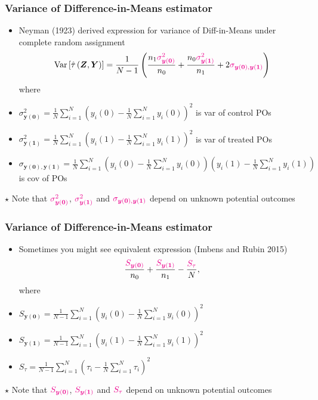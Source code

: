 \documentclass[table, xcolor = {dvipsnames}, 9pt]{beamer}
\theoremstyle{plain}
\newcommand{\mh}[1]{{\color{magenta}{#1}}}
\DeclareMathOperator{\Var}{\rm{Var}}
\begin{document}
\begin{frame}
\frametitle{Variance of Difference-in-Means estimator}
\begin{itemize}
\item Neyman (1923) derived expression for variance of Diff-in-Means under complete random assignment
\begin{equation*}
\Var\left[\hat{\tau}\left(\bm{Z}, \bm{Y}\right)\right] = \frac{1}{N - 1}\left(\frac{n_1 \mh{\sigma^2_{\bm{y}(\bm{0})}}}{n_0} + \frac{n_0 \mh{\sigma^2_{\bm{y}(\bm{1})}}}{n_1} + 2\mh{\sigma_{\bm{y}(\bm{0}), \bm{y}(\bm{1})}}\right)
\end{equation*}  
where 
\item[] $\sigma^2_{\bm{y}(\bm{0})} = \frac{1}{N} \sum \limits_{i = 1}^N \left(y_i(0) - \frac{1}{N} \sum \limits_{i = 1}^N y_i(0)\right)^2$ is var of control POs
\item[] $\sigma^2_{\bm{y}(\bm{1})} = \frac{1}{N} \sum \limits_{i = 1}^N \left(y_i(1) - \frac{1}{N} \sum \limits_{i = 1}^N y_i(1)\right)^2$ is var of treated POs
\item[] $\sigma_{\bm{y}(\bm{0}), \bm{y}(\bm{1})} = \frac{1}{N} \sum \limits_{i = 1}^N \left(y_i(0) - \frac{1}{N} \sum \limits_{i = 1}^N y_i(0)\right)\left(y_i(1) - \frac{1}{N} \sum \limits_{i = 1}^N y_i(1)\right)$ is cov of POs
\end{itemize} \pause
\vspace{1em}
$\star$ Note that $\mh{\sigma^2_{\bm{y}(\bm{0})}}$, $\mh{\sigma^2_{\bm{y}(\bm{1})}}$ and $\mh{\sigma_{\bm{y}(\bm{0}), \bm{y}(\bm{1})}}$ depend on unknown potential outcomes
\end{frame}
\begin{frame}
\frametitle{Variance of Difference-in-Means estimator}
\begin{itemize}
\item Sometimes you might see equivalent expression (Imbens and Rubin 2015)
\begin{equation*}
\dfrac{\mh{S_{\bm{y}(\bm{0})}}}{n_0} + \dfrac{\mh{S_{\bm{y}(\bm{1})}}}{n_1} - \dfrac{\mh{S_{\tau}}}{N},
\end{equation*}
where
\item[] $S_{\bm{y}(\bm{0})} = \frac{1}{N - 1} \sum \limits_{i = 1}^N \left(y_i(0) - \frac{1}{N} \sum \limits_{i = 1}^N y_i(0)\right)^2$
\item[] $S_{\bm{y}(\bm{1})} = \frac{1}{N - 1} \sum \limits_{i = 1}^N \left(y_i(1) - \frac{1}{N} \sum \limits_{i = 1}^N y_i(1)\right)^2$ 
\item[] $S_{\tau} = \frac{1}{N - 1} \sum \limits_{i = 1}^N \left(\tau_i - \frac{1}{N} \sum \limits_{i = 1}^N \tau_i\right)^2$
\end{itemize} \pause
\vspace{1em}
$\star$ Note that $\mh{S_{\bm{y}(\bm{0})}}$, $\mh{S_{\bm{y}(\bm{1})}}$ and $\mh{S_{\tau}}$ depend on unknown potential outcomes
\end{frame}
\end{document}
